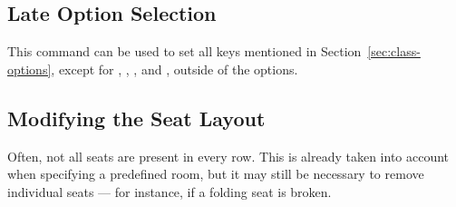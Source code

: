 \documentclass[
babel-options={english},
load-preamble-,
title=compact
]{cnltx-doc}
\begin{document}






\subsection{Late Option Selection}
\label{sec:late-options}
\begin{commands}
  This command can be used to set all keys mentioned in
  Section~\ref{sec:class-options}, except for
  , , , and ,
  outside of the  options.
\end{commands}

\subsection{Modifying the Seat Layout}
\label{sec:modify-layout}
Often, not all seats are present in every row.
This is already taken into account when specifying a predefined room,
but it may still be necessary to remove individual seats — for instance,
if a folding seat is broken.
\end{document}
